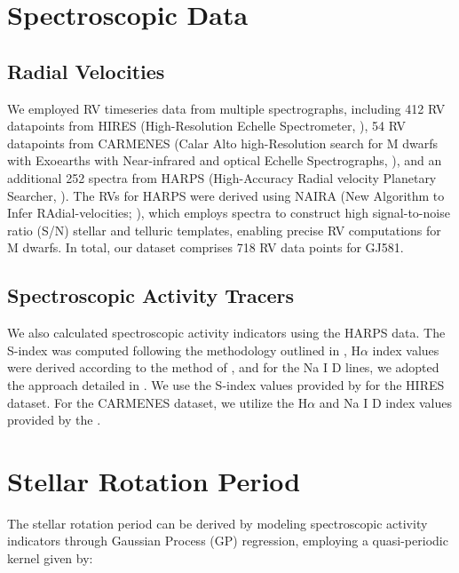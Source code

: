 \documentclass[baaa]{baaa}
\begin{document}
\section{Spectroscopic Data}\label{sec2}
\subsection{Radial Velocities}
We employed RV timeseries data from multiple spectrographs, including 412 RV datapoints from HIRES (High-Resolution Echelle Spectrometer, \citealp{2017Butler}), 54 RV datapoints from CARMENES (Calar Alto high-Resolution search for M dwarfs with Exoearths with Near-infrared and optical Echelle Spectrographs, \citealp{CARMENES}), and an additional 252 spectra from HARPS
(High-Accuracy Radial velocity Planetary Searcher, \citealp{HARPS}). The RVs for HARPS were derived using NAIRA (New Algorithm to Infer RAdial-velocities; \citealp{2017bAstudillo}), which employs spectra to construct high signal-to-noise ratio (S/N) stellar and telluric templates, enabling precise RV computations for M dwarfs. In total, our dataset comprises 718 RV data points for GJ581.

\subsection{Spectroscopic Activity Tracers}
We also calculated spectroscopic activity indicators using the HARPS data. The S-index was computed following the methodology outlined in \cite{2017a-Astudillo}, H$\alpha$ index values were derived according to the method of \cite{2011GomesDaSilva}, and for the Na I D lines, we adopted the approach detailed in \cite{2017bAstudillo}. We use the S-index values provided by \cite{2017Butler} for the HIRES dataset. For the CARMENES dataset, we utilize the H$\alpha$ and Na I D index values provided by the \cite{CARMENES}.



\section{Stellar Rotation Period}\label{sec3}

The stellar rotation period can be derived by modeling spectroscopic activity indicators through Gaussian Process (GP) regression, employing a quasi-periodic kernel \citep[e.g.,][]{2015Rajpaul,2016Faria} given by:
\end{document}
